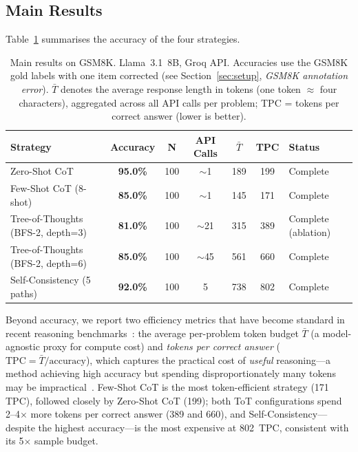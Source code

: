 ﻿\documentclass[runningheads]{llncs}
\begin{document}
\subsection{Main Results}

Table~\ref{tab:main} summarises the accuracy of the four strategies.

\begin{table}[H]
\centering
\caption{Main results on GSM8K. Llama~3.1~8B, Groq API.
Accuracies use the GSM8K gold labels with one item corrected (see
Section~\ref{sec:setup}, \emph{GSM8K annotation error}).
$\bar{T}$ denotes the average response length in tokens (one token
$\approx$ four characters), aggregated across all API calls per problem;
TPC = tokens per correct answer (lower is better).}
\label{tab:main}
\begin{tabular}{@{}lcccccl@{}}
\toprule
\textbf{Strategy} & \textbf{Accuracy} & \textbf{N} &
\textbf{API Calls} & \boldmath$\bar{T}$ & \textbf{TPC} & \textbf{Status} \\
\midrule
Zero-Shot CoT                     & \textbf{95.0\%} & 100 & $\sim$1  & 189  & 199  & Complete \\
Few-Shot CoT (8-shot)             & \textbf{85.0\%} & 100 & $\sim$1  & 145  & 171  & Complete \\
Tree-of-Thoughts (BFS-2, depth=3) & \textbf{81.0\%} & 100 & $\sim$21 & 315  & 389  & Complete (ablation) \\
Tree-of-Thoughts (BFS-2, depth=6) & \textbf{85.0\%} & 100 & $\sim$45 & 561  & 660  & Complete \\
Self-Consistency (5 paths)        & \textbf{92.0\%} & 100 & 5        & 738  & 802  & Complete \\
\bottomrule
\end{tabular}
\end{table}

Beyond accuracy, we report two efficiency metrics that have become
standard in recent reasoning benchmarks~\cite{ockbench2025,tale2024}:
the average per-problem token budget $\bar{T}$ (a model-agnostic proxy
for compute cost) and \textit{tokens per correct answer}
($\text{TPC} = \bar{T} / \text{accuracy}$), which captures the
practical cost of \emph{useful} reasoning---a method achieving high
accuracy but spending disproportionately many tokens may be
impractical~\cite{yao2023tot,ockbench2025}.
Few-Shot CoT is the most token-efficient strategy (171 TPC), followed
closely by Zero-Shot CoT (199); both ToT configurations spend
2--4$\times$ more tokens per correct answer (389 and 660), and
Self-Consistency---despite the highest accuracy---is the most expensive
at 802~TPC, consistent with its 5$\times$ sample budget.
\end{document}
